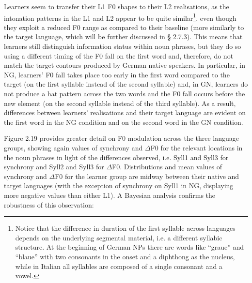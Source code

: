 \begin{styleStandard}
Learners seem to transfer their L1 F0 shapes to their L2 realisations, as the intonation patterns in the L1 and L2 appear to be quite similar\footnote{Notice that the difference in duration of the first syllable across languages depends on the underlying segmental material, i.e. a different syllabic structure. At the beginning of German NPs there are words like “graue” and “blaue” with two consonants in the onset and a diphthong as the nucleus, while in Italian all syllables are composed of a single consonant and a vowel.\par }, even though they exploit a reduced F0 range as compared to their baseline (more similarly to the target language, which will be further discussed in § 2.7.3). This means that learners still distinguish information status within noun phrases, but they do so using a different timing of the F0 fall on the first word and, therefore, do not match the target contours produced by German native speakers. In particular, in NG, learners’ F0 fall takes place too early in the first word compared to the target (on the first syllable instead of the second syllable) and, in GN, learners do not produce a hat pattern across the two words and the F0 fall occurs before the new element (on the second syllable instead of the third syllable). As a result, differences between learners’ realisations and their target language are evident on the first word in the NG condition and on the second word in the GN condition.
\end{styleStandard}

\begin{styleStandard}
Figure 2.19 provides greater detail on F0 modulation across the three language groups, showing again values of synchrony and ${\Delta}$F0 for the relevant locations in the noun phrases in light of the differences observed, i.e. Syll1 and Syll3 for synchrony and Syll2 and Syll3 for ${\Delta}$F0. Distributions and mean values of synchrony and ${\Delta}$F0 for the learner group are midway between their native and target languages (with the exception of synchrony on Syll1 in NG, displaying more negative values than either L1). A Bayesian analysis confirms the robustness of this observation:
\end{styleStandard}

